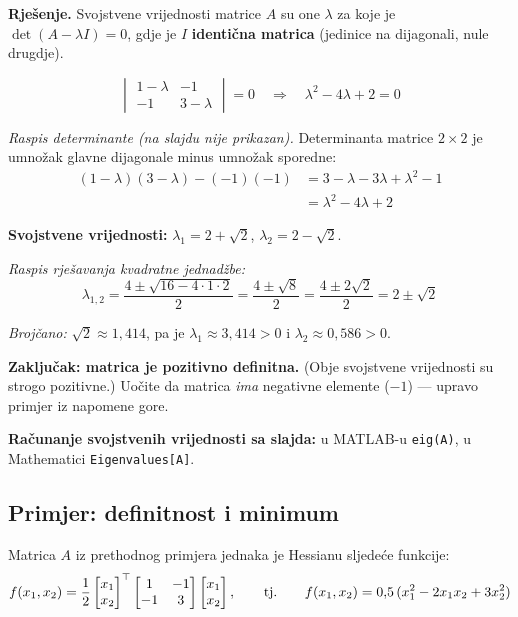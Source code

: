 \textbf{Rješenje.} Svojstvene vrijednosti matrice $A$ su one $\lambda$ za koje
je $\det(A - \lambda I) = 0$, gdje je $I$ \textbf{identična matrica} (jedinice
na dijagonali, nule drugdje).

\[
\begin{vmatrix} 1-\lambda & -1 \\ -1 & 3-\lambda \end{vmatrix} = 0
\quad\Longrightarrow\quad \lambda^2 - 4\lambda + 2 = 0
\]

\emph{Raspis determinante (na slajdu nije prikazan).} Determinanta matrice
$2\times2$ je umnožak glavne dijagonale minus umnožak sporedne:
\begin{align}
(1-\lambda)(3-\lambda) - (-1)(-1)
&= 3 - \lambda - 3\lambda + \lambda^2 - 1 \\
&= \lambda^2 - 4\lambda + 2
\end{align}

\textbf{Svojstvene vrijednosti:}
$\lambda_1 = 2 + \sqrt{2}$, $\lambda_2 = 2 - \sqrt{2}$.

\emph{Raspis rješavanja kvadratne jednadžbe:}
\[
\lambda_{1,2} = \frac{4 \pm \sqrt{16 - 4\cdot 1 \cdot 2}}{2}
= \frac{4 \pm \sqrt{8}}{2} = \frac{4 \pm 2\sqrt{2}}{2} = 2 \pm \sqrt{2}
\]

\emph{Brojčano:} $\sqrt{2} \approx 1{,}414$, pa je
$\lambda_1 \approx 3{,}414 > 0$ i $\lambda_2 \approx 0{,}586 > 0$.

\textbf{Zaključak: matrica je pozitivno definitna.} (Obje svojstvene
vrijednosti su strogo pozitivne.) Uočite da matrica \emph{ima} negativne
elemente ($-1$) --- upravo primjer iz napomene gore.

\textbf{Računanje svojstvenih vrijednosti sa slajda:} u MATLAB-u
\texttt{eig(A)}, u Mathematici \texttt{Eigenvalues[A]}.

\subsection{Primjer: definitnost i minimum}

Matrica $A$ iz prethodnog primjera jednaka je Hessianu sljedeće funkcije:
\[
f(x_1, x_2) = \frac{1}{2}
\begin{bmatrix} x_1 \\ x_2 \end{bmatrix}^{\top}
\begin{bmatrix} 1 & -1 \\ -1 & 3 \end{bmatrix}
\begin{bmatrix} x_1 \\ x_2 \end{bmatrix},
\qquad\text{tj.}\qquad
f(x_1,x_2) = 0{,}5\,(x_1^2 - 2x_1x_2 + 3x_2^2)
\]

